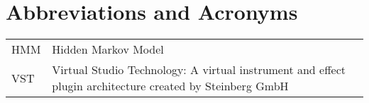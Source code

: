 \chapter*{Abbreviations and Acronyms}


\noindent
\begin{longtable}{@{}p{}p{}@{}}
HMM & Hidden Markov Model \\
VST & Virtual Studio Technology: A virtual instrument and effect plugin architecture created by Steinberg GmbH

\end{longtable}
